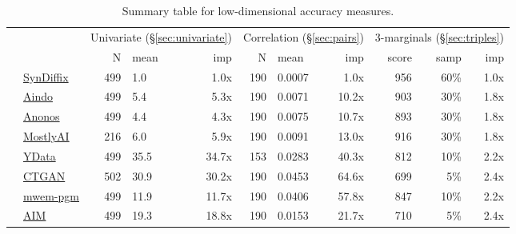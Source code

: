 \begin{table}
    \centering
    \caption{Summary table for low-dimensional accuracy measures.}
    \label{tab:accuracy}
    \begin{tabular}{llrlr@{\hskip 10pt}r@{\hskip 6pt}l@{\hskip 6pt}r@{\hskip 10pt}r@{\hskip 6pt}r@{\hskip 6pt}r}
        \toprule
          &   & \multicolumn{3}{c}{Univariate (\S\ref{sec:univariate})} & \multicolumn{3}{c}{Correlation (\S\ref{sec:pairs})} & \multicolumn{3}{c}{3-marginals (\S\ref{sec:triples})} \\
        
 & & N & mean & imp & N & mean & imp & score & samp & imp \\
\midrule
        \cellcolor{blue} & \href{https://htmlpreview.github.io/?https://github.com/yoid2000/sdnist-summary/blob/main/results/syndiffix_all/report.html}{SynDiffix} & 499 & 1.0 & 1.0x & 190 & 0.0007 & 1.0x & 956 & 60\% & 1.0x \\
        \cellcolor{red} & \href{https://htmlpreview.github.io/?https://github.com/yoid2000/sdnist-summary/blob/main/results/aindo_synth/report.html}{Aindo} & 499 & 5.4 & 5.3x & 190 & 0.0071 & 10.2x & 903 & 30\% & 1.8x \\
        \cellcolor{red} & \href{https://htmlpreview.github.io/?https://github.com/yoid2000/sdnist-summary/blob/main/results/anonos_sdk/report.html}{Anonos} & 499 & 4.4 & 4.3x & 190 & 0.0075 & 10.7x & 893 & 30\% & 1.8x \\
        \cellcolor{red} & \href{https://htmlpreview.github.io/?https://github.com/yoid2000/sdnist-summary/blob/main/results/mostlyai_sd_platform/report.html}{MostlyAI} & 216 & 6.0 & 5.9x & 190 & 0.0091 & 13.0x & 916 & 30\% & 1.8x \\
        \cellcolor{red} & \href{https://htmlpreview.github.io/?https://github.com/yoid2000/sdnist-summary/blob/main/results/ydata_fabric_synthesizers/report.html}{YData} & 499 & 35.5 & 34.7x & 153 & 0.0283 & 40.3x & 812 & 10\% & 2.2x \\
        \cellcolor{red} & \href{https://htmlpreview.github.io/?https://github.com/yoid2000/sdnist-summary/blob/main/results/sdv_ctgan_epochs1000/report.html}{CTGAN} & 502 & 30.9 & 30.2x & 190 & 0.0453 & 64.6x & 699 & 5\% & 2.4x \\
        \cellcolor{ForestGreen} & \href{https://htmlpreview.github.io/?https://github.com/yoid2000/sdnist-summary/blob/main/results/mwem_pgm/report.html}{mwem-pgm} & 499 & 11.9 & 11.7x & 190 & 0.0406 & 57.8x & 847 & 10\% & 2.2x \\
        \cellcolor{ForestGreen} & \href{https://htmlpreview.github.io/?https://github.com/yoid2000/sdnist-summary/blob/main/results/aim_e_10_all/report.html}{AIM} & 499 & 19.3 & 18.8x & 190 & 0.0153 & 21.7x & 710 & 5\% & 2.4x \\

\end{tabular}
\end{table}
